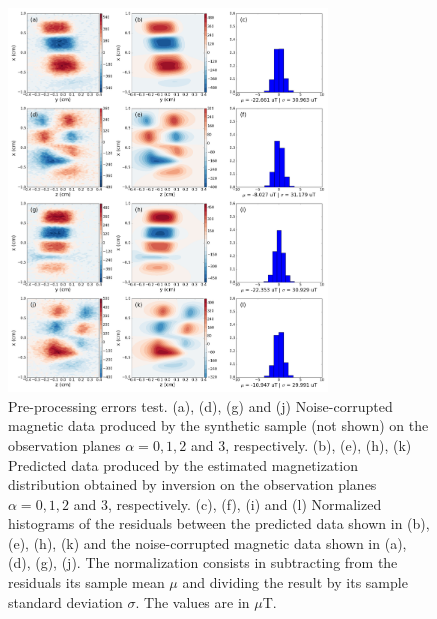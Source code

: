 \documentclass[galley,gc]{agutex}
\begin{document}
 \begin{figure}
 \noindent \includegraphics[width=20pc]{Figs/Fig7_LQ.png}
 \caption{Pre-processing errors test. (a), (d), (g) and (j) Noise-corrupted
 magnetic data produced by the synthetic sample (not shown) on the
 observation planes $\alpha = 0, 1, 2$ and $3$, respectively.
 (b), (e), (h), (k) Predicted data produced by the estimated
 magnetization distribution obtained by inversion on the
 observation planes $\alpha = 0, 1, 2$ and $3$, respectively.
 (c), (f), (i) and (l) Normalized histograms of the residuals between the
 predicted data shown in (b), (e), (h), (k) and the 
 noise-corrupted magnetic data shown in (a), (d), (g), (j). 
 The normalization
 consists in subtracting from the residuals its sample mean $\mu$ 
 and dividing the result by its sample standard deviation $\sigma$.
 The values are in $\mu$T.}
 \label{fig:datafit-pre-processing}
 \end{figure}
 
\end{document}
